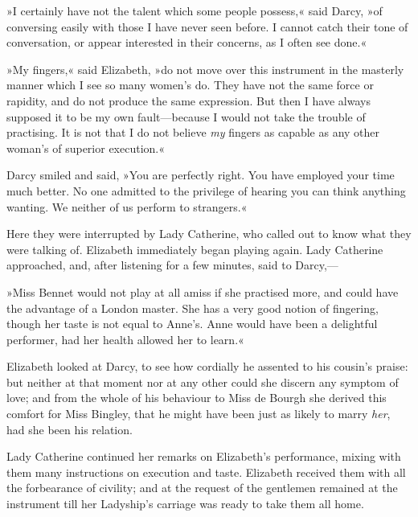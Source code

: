 »I certainly have not the talent which some people possess,« said Darcy, »of conversing easily with those I have never seen before. I cannot catch their tone of conversation, or appear interested in their concerns, as I often see done.«

»My fingers,« said Elizabeth, »do not move over this instrument in the masterly manner which I see so many women's do. They have not the same force or rapidity, and do not produce the same expression. But then I have always supposed it to be my own fault—because I would not take the trouble of practising. It is not that I do not believe \textit{my} fingers as capable as any other woman's of superior execution.«

Darcy smiled and said, »You are perfectly right. You have employed your time much better. No one admitted to the privilege of hearing you can think anything wanting. We neither of us perform to strangers.«

Here they were interrupted by Lady Catherine, who called out to know what they were talking of. Elizabeth immediately began playing again. Lady Catherine approached, and, after listening for a few minutes, said to Darcy,—

»Miss Bennet would not play at all amiss if she practised more, and could have the advantage of a London master. She has a very good notion of fingering, though her taste is not equal to Anne's. Anne would have been a delightful performer, had her health allowed her to learn.«

Elizabeth looked at Darcy, to see how cordially he assented to his cousin's praise: but neither at that moment nor at any other could she discern any symptom of love; and from the whole of his behaviour to Miss de Bourgh she derived this comfort for Miss Bingley, that he might have been just as likely to marry \textit{her}, had she been his relation.

Lady Catherine continued her remarks on Elizabeth's performance, mixing with them many instructions on execution and taste. Elizabeth received them with all the forbearance of civility; and at the request of the gentlemen remained at the instrument till her Ladyship's carriage was ready to take them all home.
